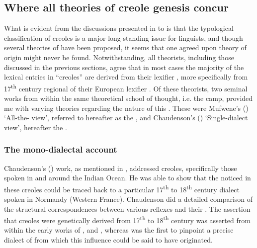 \subsection {Where all theories of {creole genesis} concur}\label{2.2.4}
What is evident from the discussions presented in  to  is that the typological classification of creoles is a major long-standing issue for  linguists, and though several theories of  have been proposed, it seems that one agreed upon theory of origin might never be found. Notwithstanding, all theorists, including those discussed in the previous sections, agree that in most cases the majority of the lexical entries in ``creoles'' are derived from their lexifier , more specifically from 17\textsuperscript{th} century regional  of their European lexifier  \citep{Chaudenson92, Chaudenson01, Mufwene96, Mufwene08, Lefebvre04, McWhorter05}. Of these theorists, two seminal works from within the same theoretical school of thought, i.e. the  camp, provided me with varying theories regarding the nature of this  . These were Mufwene's (\citeyear{Mufwene01, Mufwene08}) `All-the- view', referred to hereafter as the , and  Chaudenson's (\citeyear{Chaudenson79, Chaudenson92, Chaudenson01}) `Single-dialect view', hereafter the .

\subsubsection {The mono-dialectal account}\label{2.2.4.1}
 Chaudenson's (\citeyear{Chaudenson79}) work, as mentioned in , addressed  creoles, specifically those spoken in and around the Indian Ocean. He was able to show that the  noticed in these creoles could be traced back to a particular 17\textsuperscript{th} to 18\textsuperscript{th} century  dialect spoken in Normandy (Western France). Chaudenson did a detailed comparison of the structural correspondences between various   reflexes and their  . The assertion that  creoles were genetically derived from 17\textsuperscript{th} to 18\textsuperscript{th} century  was asserted from within the early works of \citet{Hall53}, and \citet{Goodman64}, whereas  \citet{Chaudenson79} was the first to pinpoint a precise dialect of  from which this influence could be said to have originated.

